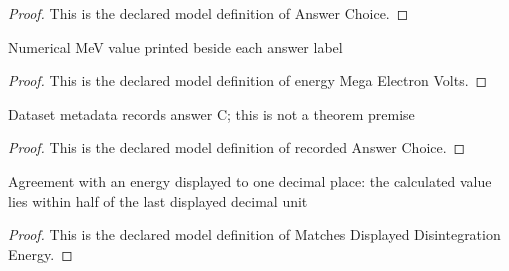 \begin{proof}
  This is the declared model definition of Answer Choice.
\end{proof}
\begin{definition}
  \label{def:physics:phyx-mini-0618:phyxminiproblems-problemphyxmini0618-answerchoice-energymegaelectronvolts}
  Numerical MeV value printed beside each answer label
\end{definition}
\begin{proof}
  This is the declared model definition of energy Mega Electron Volts.
\end{proof}
\begin{definition}
  \label{def:physics:phyx-mini-0618:phyxminiproblems-problemphyxmini0618-recordedanswerchoice}
  Dataset metadata records answer C; this is not a theorem premise
\end{definition}
\begin{proof}
  This is the declared model definition of recorded Answer Choice.
\end{proof}
\begin{definition}
  \label{def:physics:phyx-mini-0618:phyxminiproblems-problemphyxmini0618-matchesdisplayeddisintegrationenergy}
  Agreement with an energy displayed to one decimal place: the calculated value lies within half of the last displayed decimal unit
\end{definition}
\begin{proof}
  This is the declared model definition of Matches Displayed Disintegration Energy.
\end{proof}
